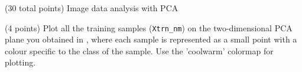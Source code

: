 \documentclass[12pt]{article}
\begin{document}
\begin{question}{(30 total points) Image data analysis with PCA}
\begin{subquestion}
  


   \end{subquestion}
   \begin{subquestion}{(4 points)
       Plot all the training samples (\texttt{Xtrn\_nm}) on the
       two-dimensional PCA plane you obtained in , where each sample is
       represented as a small point with a colour specific to the class of
       the sample.  Use the 'coolwarm' colormap for plotting.
     } \label{Q1.8}



\end{subquestion}
\end{question}
\end{document}
